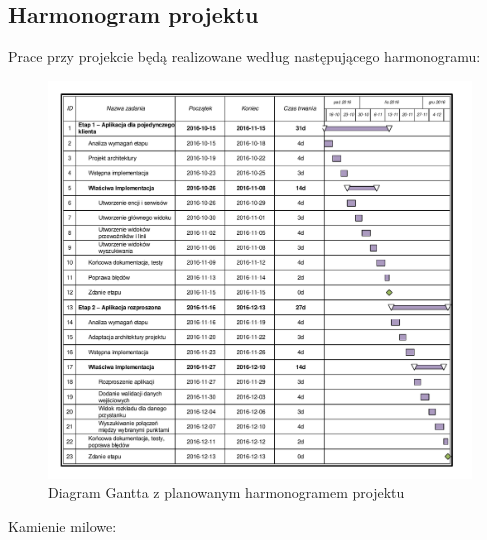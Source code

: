 \documentclass[10pt,a4paper]{article}
\begin{document}
\subsection{Harmonogram projektu}
Prace przy projekcie będą realizowane według następującego harmonogramu:
\begin{figure}[H]
	\centering
	\includegraphics[width=14cm]{gantt.pdf}
	\caption{Diagram Gantta z planowanym harmonogramem projektu}
\end{figure}
Kamienie milowe:
\end{document}

